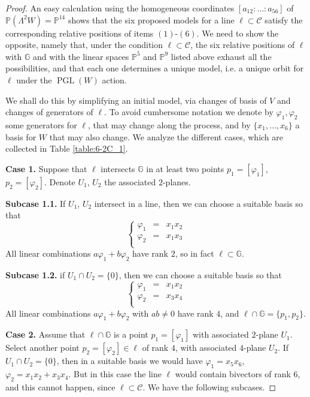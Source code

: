 \documentclass[10pt,reqno]{amsart}
\newcommand{\cC}{{\mathcal{C}}}
\newcommand{\GG}{\mathbb{G}}
\newcommand{\PP}{\mathbb P}
\newcommand{\PGL}{\operatorname{PGL}}
\newcommand{\f}{\varphi}
\renewcommand{\L}{\Lambda}
\theoremstyle{definition}
\begin{document}
\begin{proof}
An easy calculation using the homogeneous coordinates $[a_{12}:\dots: a_{56}]$ of $\PP(\L^2 W)=\PP^{14}$ shows that the six proposed models for a line $\ell \subset \cC$ satisfy the corresponding relative positions of items $(1)$-$(6)$. We need to show the opposite, namely that, under the condition $\ell \subset \cC$, the six relative positions of $\ell$ with $\GG$ and with the linear spaces $\PP^5$ and $\PP^9$ listed above exhaust all the possibilities, and that each one determines a unique model, i.e. a unique orbit for $\ell$ under the $\PGL(W)$ action.

\noindent We shall do this by simplifying an initial model, via changes of basis of $V$ and changes of generators of $\ell$. To avoid cumbersome notation we denote by $\f_1, \f_2$ some generators for $\ell$, that may change along the process, and by $\{x_1,\ldots,x_6\}$ a basis for $W$ that may also change. We analyze the different cases, which are collected in Table \ref{table:6-2C_1}.

\item \textbf{Case 1.} Suppose that $\ell$ intersects $\GG$ in at least two points $p_1=[\f_1]$, $p_2=[\f_2]$. Denote $U_1$, $U_2$ the associated $2$-planes.

\item \textbf{Subcase 1.1.} If $U_1$, $U_2$ intersect in a line, then we can choose a suitable basis so that
\[
\left\{\begin{array}{ccl}
 \f_1 & = & x_1x_2\\
 \f_2 & = & x_1x_3\\
\end{array}\right.
\]
All linear combinations $a\f_1+b\f_2$ have rank $2$, so in fact $\ell \subset \GG$. 

\item \textbf{Subcase 1.2.} if $U_1 \cap U_2=\{0\}$, then we can choose a suitable basis so that
\[
\left\{\begin{array}{ccl}
 \f_1 & = & x_1x_2\\
 \f_2 & = & x_3x_4\\
\end{array}\right.
\]
All linear combinations $a\f_1+b\f_2$ with $ab\neq 0$ have rank $4$, and $\ell \cap \GG=\{p_1,p_2\}$.

\item \textbf{Case 2.} Assume that $\ell \cap \GG$ is a point $p_1=[\f_1]$ with associated $2$-plane $U_1$. Select another point $p_2=[\f_2] \in \ell$ of rank $4$, with associated $4$-plane $U_2$. 
If $U_1 \cap U_2=\{0\}$, then in a suitable basis we would have $\f_1=x_5 x_6$, $\f_2=x_1 x_2 + x_3 x_4$. But in this case the line $\ell$ would contain bivectors of rank $6$, and this cannot happen, since $\ell\subset\cC$. We have the following subcases.


\end{proof}
\end{document}
